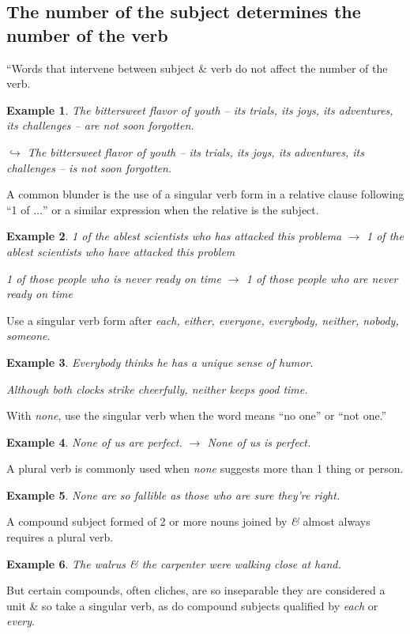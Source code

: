 \documentclass[oneside]{book}
\numberwithin{equation}{section}
\newtheorem{example}{Example}[chapter]
\begin{document}
\subsection{The number of the subject determines the number of the verb}
``Words that intervene between subject \& verb do not affect the number of the verb.

\begin{example}
	The bittersweet flavor of youth -- its trials, its joys, its adventures, its challenges -- are not soon forgotten.
	
	$\hookrightarrow$ The bittersweet flavor of youth -- its trials, its joys, its adventures, its challenges -- is not soon forgotten.
\end{example}
A common blunder is the use of a singular verb form in a relative clause following ``1 of $\ldots$'' or a similar expression when the relative is the subject.

\begin{example}
	1 of the ablest scientists who has attacked this problema $\to$ 1 of the ablest scientists who have attacked this problem
	
	1 of those people who is never ready on time $\to$ 1 of those people who are never ready on time
\end{example}
Use a singular verb form after \textit{each, either, everyone, everybody, neither, nobody, someone}.

\begin{example}
	Everybody thinks he has a unique sense of humor.
	
	Although both clocks strike cheerfully, neither keeps good time.
\end{example}
With \textit{none}, use the singular verb when the word means ``no one'' or ``not one.''

\begin{example}
	None of us are perfect. $\to$ None of us is perfect.
\end{example}
A plural verb is commonly used when \textit{none} suggests more than 1 thing or person.

\begin{example}
	None are so fallible as those who are sure they're right.
\end{example}
A compound subject formed of 2 or more nouns joined by \textit{\&} almost always requires a plural verb.

\begin{example}
	The walrus \& the carpenter were walking close at hand.
\end{example}
But certain compounds, often cliches, are so inseparable they are considered a unit \& so take a singular verb, as do compound subjects qualified by \textit{each} or \textit{every}.
\end{document}
